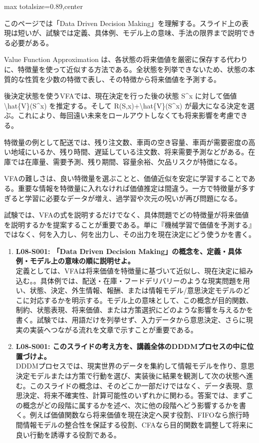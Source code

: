 \begin{minipage}[t]{0.58\textwidth}
\begin{adjustbox}{max totalsize={\textwidth}{0.89\textheight},center}
\begin{minipage}{\textwidth}\scriptsize
{}このページでは「Data Driven Decision Making」を理解する。スライド上の表現は短いが、試験では定義、具体例、モデル上の意味、手法の限界まで説明できる必要がある。\par
Value Function Approximation は、各状態の将来価値を厳密に保存する代わりに、特徴量を使って近似する方法である。全状態を列挙できないため、状態の本質的な性質を少数の特徴で表し、その特徴から将来価値を予測する。\par
後決定状態を使うVFAでは、現在決定を行った後の状態 S\textasciicircum{}x に対して価値 \textbackslash{}hat\{V\}(S\textasciicircum{}x) を推定する。そして R(S,x)+\textbackslash{}hat\{V\}(S\textasciicircum{}x) が最大になる決定を選ぶ。これにより、毎回遠い未来をロールアウトしなくても将来影響を考慮できる。\par
特徴量の例として配送では、残り注文数、車両の空き容量、車両が需要密度の高い地域にいるか、残り時間、遅延している注文数、将来需要予測などがある。在庫では在庫量、需要予測、残り期間、容量余裕、欠品リスクが特徴になる。\par
VFAの難しさは、良い特徴量を選ぶことと、価値近似を安定に学習することである。重要な情報を特徴量に入れなければ価値推定は間違う。一方で特徴量が多すぎると学習に必要なデータが増え、過学習や次元の呪いが再び問題になる。\par
試験では、VFAの式を説明するだけでなく、具体問題でどの特徴量が将来価値を説明するかを提案することが重要である。単に『機械学習で価値を予測する』ではなく、何を入力し、何を出力し、その出力を現在決定にどう使うかを書く。\par{}\begin{enumerate}\item \textbf{L08-S001: 「Data Driven Decision Making」の概念を、定義・具体例・モデル上の意味の順に説明せよ。}\\定義としては、VFAは将来価値を特徴量に基づいて近似し、現在決定に組み込む。。具体例では、配送・在庫・フードデリバリーのような現実問題を用い、状態、決定、外生情報、報酬、または情報モデル/意思決定モデルのどこに対応するかを明示する。モデル上の意味として、この概念が目的関数、制約、状態表現、将来価値、または方策選択にどのような影響を与えるかを書く。試験では、用語だけを列挙せず、入力データから意思決定、さらに現実の実装へつながる流れを文章で示すことが重要である。\item \textbf{L08-S001: このスライドの考え方を、講義全体のDDDMプロセスの中に位置づけよ。}\\DDDMプロセスでは、現実世界のデータを集約して情報モデルを作り、意思決定モデルまたは方策で行動を選び、実装後に結果を観測して次の状態へ進む。このスライドの概念は、そのどこか一部だけではなく、データ表現、意思決定、将来不確実性、計算可能性のいずれかに関わる。答案では、まずこの概念がどの段階に属するかを述べ、次に他の段階へどう影響するかを書く。例えば価値関数なら将来価値を現在決定へ戻す役割、FIFOなら旅行時間情報モデルの整合性を保証する役割、CFAなら目的関数を調整して将来に良い行動を誘導する役割である。\end{enumerate}

\end{minipage}
\end{adjustbox}
\end{minipage}
